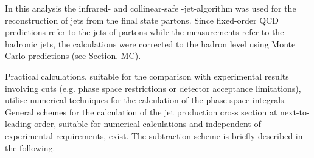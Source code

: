 In this analysis the infrared- and collinear-safe \kt-jet-algorithm was used for the reconstruction of jets from the final state partons. Since fixed-order QCD predictions refer to the jets of partons while the measurements refer to the hadronic jets, the calculations were corrected to the hadron level using Monte Carlo predictions (see Section. MC).

Practical calculations, suitable for the comparison with experimental results involving cuts (e.g. phase space restrictions or detector acceptance limitations), utilise numerical techniques for the calculation of the phase space integrals. General schemes for the calculation of the jet production cross section at next-to-leading order, suitable for numerical calculations and independent of experimental requirements, exist. The subtraction scheme is briefly described in the following. 